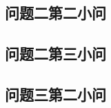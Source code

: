 \documentclass[bwprint]{gmcmthesis}
\begin{document}
\subsection{问题二第二小问}


\subsection{问题二第三小问}


% 

% 

\subsection{问题三第二小问}


% 
\end{document}
